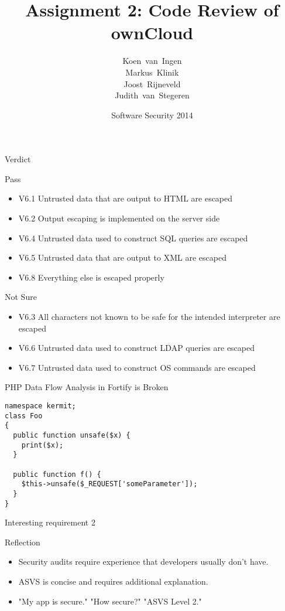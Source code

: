 \documentclass{beamer}
\title
{Assignment 2: Code Review of ownCloud}
\author
{
Koen~van~Ingen\\
Markus~Klinik\\
Joost~Rijneveld\\
Judith~van~Stegeren\\
}
\institute[Radboud University Nijmegen]
{
  Radboud University Nijmegen
}
\date
{Software Security 2014}
\begin{document}
\begin{frame}
  \titlepage
\end{frame}


\begin{frame}{Verdict}
\fontsize{8}{12.0}\selectfont

Pass
\begin{itemize}
\item V6.1 Untrusted data that are output to HTML are escaped
\item V6.2 Output escaping is implemented on the server side
\item V6.4 Untrusted data used to construct SQL queries are escaped
\item V6.5 Untrusted data that are output to XML are escaped
\item V6.8 Everything else is escaped properly
\end{itemize}

\medskip
Not Sure
\begin{itemize}
\item V6.3 All characters not known to be safe for the intended interpreter are escaped
\item V6.6 Untrusted data used to construct LDAP queries are escaped
\item V6.7 Untrusted data used to construct OS commands are escaped
\end{itemize}

\end{frame}


\begin{frame}[fragile]{PHP Data Flow Analysis in Fortify is Broken}

\begin{verbatim}
namespace kermit;
class Foo
{
  public function unsafe($x) {
    print($x);
  }

  public function f() {
    $this->unsafe($_REQUEST['someParameter']);
  }
}
\end{verbatim}

\end{frame}


\begin{frame}{Interesting requirement 2}

\end{frame}


\begin{frame}{Reflection}
\begin{itemize}
\item Security audits require experience that developers usually don't have.
\item ASVS is concise and requires additional explanation.
\item "My app is secure." "How secure?" "ASVS Level 2."
\end{itemize}
\end{frame}
\end{document}
